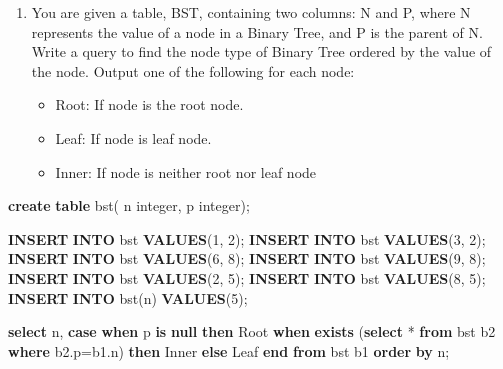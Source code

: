 \documentclass[
]{article}
\newenvironment{Shaded}{}{}
\newcommand{\ControlFlowTok}[1]{\textcolor[rgb]{0.00,0.44,0.13}{\textbf{#1}}}
\newcommand{\DataTypeTok}[1]{\textcolor[rgb]{0.56,0.13,0.00}{#1}}
\newcommand{\DecValTok}[1]{\textcolor[rgb]{0.25,0.63,0.44}{#1}}
\newcommand{\KeywordTok}[1]{\textcolor[rgb]{0.00,0.44,0.13}{\textbf{#1}}}
\newcommand{\NormalTok}[1]{#1}
\newcommand{\OperatorTok}[1]{\textcolor[rgb]{0.40,0.40,0.40}{#1}}
\newcommand{\StringTok}[1]{\textcolor[rgb]{0.25,0.44,0.63}{#1}}
\providecommand{\tightlist}{%
  \setlength{\itemsep}{0pt}\setlength{\parskip}{0pt}}
\begin{document}
\begin{enumerate}
\def\labelenumi{\arabic{enumi}.}
\setcounter{enumi}{8}
\tightlist
\item
  You are given a table, BST, containing two columns: N and P, where N
  represents the value of a node in a Binary Tree, and P is the parent
  of N. Write a query to find the node type of Binary Tree ordered by
  the value of the node. Output one of the following for each node:

  \begin{itemize}
  \tightlist
  \item
    Root: If node is the root node.
  \item
    Leaf: If node is leaf node.
  \item
    Inner: If node is neither root nor leaf node
  \end{itemize}
\end{enumerate}

\begin{Shaded}
\begin{Highlighting}[]
\KeywordTok{create} \KeywordTok{table}\NormalTok{ bst(}
\NormalTok{n }\DataTypeTok{integer}\NormalTok{,}
\NormalTok{p }\DataTypeTok{integer}\NormalTok{);}

\KeywordTok{INSERT} \KeywordTok{INTO}\NormalTok{ bst }\KeywordTok{VALUES}\NormalTok{(}\DecValTok{1}\NormalTok{, }\DecValTok{2}\NormalTok{);}
\KeywordTok{INSERT} \KeywordTok{INTO}\NormalTok{ bst }\KeywordTok{VALUES}\NormalTok{(}\DecValTok{3}\NormalTok{, }\DecValTok{2}\NormalTok{);}
\KeywordTok{INSERT} \KeywordTok{INTO}\NormalTok{ bst }\KeywordTok{VALUES}\NormalTok{(}\DecValTok{6}\NormalTok{, }\DecValTok{8}\NormalTok{);}
\KeywordTok{INSERT} \KeywordTok{INTO}\NormalTok{ bst }\KeywordTok{VALUES}\NormalTok{(}\DecValTok{9}\NormalTok{, }\DecValTok{8}\NormalTok{);}
\KeywordTok{INSERT} \KeywordTok{INTO}\NormalTok{ bst }\KeywordTok{VALUES}\NormalTok{(}\DecValTok{2}\NormalTok{, }\DecValTok{5}\NormalTok{);}
\KeywordTok{INSERT} \KeywordTok{INTO}\NormalTok{ bst }\KeywordTok{VALUES}\NormalTok{(}\DecValTok{8}\NormalTok{, }\DecValTok{5}\NormalTok{);}
\KeywordTok{INSERT} \KeywordTok{INTO}\NormalTok{ bst(n) }\KeywordTok{VALUES}\NormalTok{(}\DecValTok{5}\NormalTok{);}

\KeywordTok{select}\NormalTok{ n, }\ControlFlowTok{case}
\ControlFlowTok{when}\NormalTok{ p }\KeywordTok{is} \KeywordTok{null} \ControlFlowTok{then} \StringTok{\textquotesingle{}Root\textquotesingle{}}
\ControlFlowTok{when} \KeywordTok{exists}\NormalTok{ (}\KeywordTok{select} \OperatorTok{*} \KeywordTok{from}\NormalTok{ bst b2 }\KeywordTok{where}\NormalTok{ b2.p}\OperatorTok{=}\NormalTok{b1.n) }\ControlFlowTok{then} \StringTok{\textquotesingle{}Inner\textquotesingle{}}
\ControlFlowTok{else} \StringTok{\textquotesingle{}Leaf\textquotesingle{}}
\ControlFlowTok{end}
\KeywordTok{from}\NormalTok{ bst b1 }\KeywordTok{order} \KeywordTok{by}\NormalTok{ n;}
\end{Highlighting}
\end{Shaded}
\end{document}
